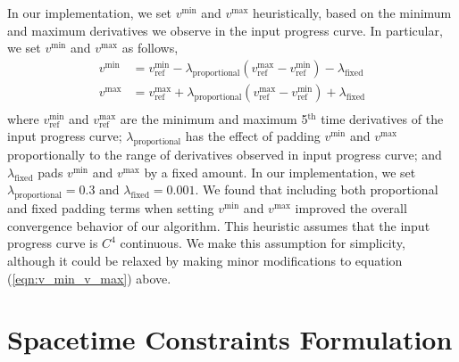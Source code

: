 In our implementation, we set $v^{\text{min}}$ and $v^{\text{max}}$ heuristically, based on the minimum and maximum derivatives we observe in the input progress curve.
In particular, we set $v^{\text{min}}$ and $v^{\text{max}}$ as follows,
%
\begin{equation}
\begin{aligned}
%
v^{\text{min}} & = v^{\text{min}}_{\text{ref}} - \lambda_{\text{proportional}} ( v^{\text{max}}_{\text{ref}} - v^{\text{min}}_{\text{ref}} ) - \lambda_{\text{fixed}} \\
v^{\text{max}} & = v^{\text{max}}_{\text{ref}} + \lambda_{\text{proportional}} ( v^{\text{max}}_{\text{ref}} - v^{\text{min}}_{\text{ref}} ) + \lambda_{\text{fixed}} \\
%
\end{aligned}
\label{eqn:v_min_v_max}
\end{equation}
%
where $v^{\text{min}}_{\text{ref}}$ and $v^{\text{max}}_{\text{ref}}$ are the minimum and maximum 5$^\text{th}$ time derivatives of the input progress curve;
$\lambda_{\text{proportional}}$ has the effect of padding $v^{\text{min}}$ and $v^{\text{max}}$ proportionally to the range of derivatives observed in input progress curve;
and $\lambda_{\text{fixed}}$ pads $v^{\text{min}}$ and $v^{\text{max}}$ by a fixed amount.
In our implementation, we set $\lambda_{\text{proportional}} = 0.3$ and $\lambda_{\text{fixed}} = 0.001$.
We found that including both proportional and fixed padding terms when setting $v^{\text{min}}$ and $v^{\text{max}}$ improved the overall convergence behavior of our algorithm.
This heuristic assumes that the input progress curve is $C^4$ continuous.
We make this assumption for simplicity, although it could be relaxed by making minor modifications to equation (\ref{eqn:v_min_v_max}) above.

\section{Spacetime Constraints Formulation}
\label{app:spacetime}


